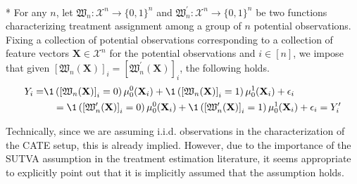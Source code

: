 \begin{boxD}
	\begin{asm}\label{asm:sutva}\mbox{}\\*
		For any $n$, let $\mathfrak{W}_{n}: \mathcal{X}^{n} \rightarrow \{0,1\}^{n}$ and $\mathfrak{W}_{n}^{\prime}: \mathcal{X}^{n} \rightarrow \{0,1\}^{n}$ be two functions characterizing treatment assignment among a group of $n$ potential observations.
		Fixing a collection of potential observations corresponding to a collection of feature vectors $\mathbf{X} \in  \mathcal{X}^{n}$ for the potential observations and $i \in [n]$, we impose that given $\left[\mathfrak{W}_{n}(\mathbf{X})\right]_{i} = \left[\mathfrak{W}_{n}^{\prime}(\mathbf{X})\right]_{i}$, the following holds.
		\begin{equation}
			\begin{aligned}
				Y_{i} = & \1\left(\left[\mathfrak{W}_{n}(\mathbf{X})\right]_{i} = 0\right)\mu_{0}^{0}(\mathbf{X}_i)
				+ \1\left(\left[\mathfrak{W}_{n}(\mathbf{X})\right]_{i} = 1\right)\mu_{0}^{1}(\mathbf{X}_i)
				+ \epsilon_i \\
				&\quad  = 
				\1\left(\left[\mathfrak{W}_{n}^{\prime}(\mathbf{X})\right]_{i} = 0\right)\mu_{0}^{0}(\mathbf{X}_i)
				+\1\left(\left[\mathfrak{W}_{n}^{\prime}(\mathbf{X})\right]_{i} = 1\right)\mu_{0}^{1}(\mathbf{X}_i)
				+ \epsilon_i
				= Y_{i}^{\prime}
			\end{aligned}
		\end{equation}
	\end{asm}
\end{boxD}
Technically, since we are assuming i.i.d. observations in the characterization of the CATE setup, this is already implied.
However, due to the importance of the SUTVA assumption in the treatment estimation literature, it seems appropriate to explicitly point out that it is implicitly assumed that the assumption holds.
